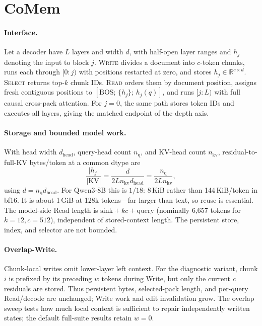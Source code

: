 \section{CoMem}
\label{sec:method}

\paragraph{Interface.}
Let a decoder have $L$ layers and width $d$, with half-open layer ranges and
$h_j$ denoting the input to block $j$. \textsc{Write} divides a document into
$c$-token chunks, runs each through $[0{:}j)$ with positions restarted at zero,
and stores $h_j\in\mathbb{R}^{c\times d}$. \textsc{Select} returns top-$k$
chunk IDs. \textsc{Read} orders them by document position, assigns fresh
contiguous positions to $[\mathrm{BOS};\,\{h_j\};\,h_j(q)]$, and runs
$[j{:}L)$ with full causal cross-pack attention. For $j{=}0$, the same path
stores token IDs and executes all layers, giving the matched endpoint of the
depth axis.

\paragraph{Storage and bounded model work.}
With head width $d_{\mathrm{head}}$, query-head count $n_{\mathrm q}$, and
KV-head count $n_{\mathrm{kv}}$, residual-to-full-KV bytes/token at a common
dtype are
\begin{equation}
\frac{\lvert h_j\rvert}{\lvert\mathrm{KV}\rvert}
=\frac{d}{2L n_{\mathrm{kv}}d_{\mathrm{head}}}
=\frac{n_{\mathrm{q}}}{2L n_{\mathrm{kv}}},
\label{eq:store}
\end{equation}
using $d=n_{\mathrm q}d_{\mathrm{head}}$. For Qwen3-8B this is $1/18$:
8\,KiB rather than 144\,KiB/token in bf16. It is about 1\,GiB at 128k
tokens---far larger than text, so reuse is essential. The model-side Read length
is $\mathrm{sink}+kc+\mathrm{query}$ (nominally 6,657 tokens for
$k{=}12,c{=}512$), independent of stored-context length. The persistent store,
index, and selector are not bounded.

\paragraph{Overlap-Write.}
Chunk-local writes omit lower-layer left context. For the diagnostic variant,
chunk $i$ is prefixed by its preceding $w$ tokens during Write, but only the
current $c$ residuals are stored. Thus persistent bytes, selected-pack length,
and per-query Read/decode are unchanged; Write work and edit invalidation grow.
The overlap sweep tests how much local context is sufficient to repair independently written states; the default full-suite results retain $w{=}0$.

